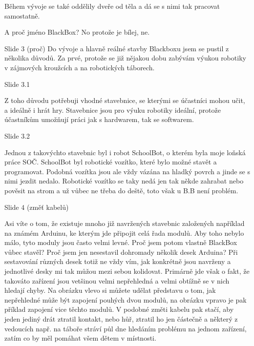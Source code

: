 Během vývoje se také oddělily dveře od těla a dá se s nimi tak pracovat samostatně.

A proč jméno BlackBox? No protože je bílej, ne. %


Slide 3 (proč)
Do vývoje a hlavně reálné stavby Blackboxu jsem se pustil z několika důvodů. 
Za prvé, protože se již nějakou dobu zabývám 
výukou robotiky v zájmových kroužcích a na robotických táborech. 

    Slide 3.1

    Z toho důvodu potřebuji 
    vhodné stavebnice, se kterými se účastníci mohou učit, a ideálně i hrát hry.
    Stavebnice jsou pro výuku robotiky ideální, protože účastníkům umožňují práci jak 
    s hardwarem, tak se softwarem. 

    Slide 3.2

    Jednou z takovýchto stavebnic byl i robot SchoolBot, o kterém byla moje loňská práce SOČ.
    SchoolBot byl robotické vozítko, které bylo možné stavět a programovat.  
    Podobná vozítka jsou ale vždy vázána na hladký povrch a jinde se s nimi jezdit nedalo.
    Robotické vozítko se taky nedá jen tak někde zahrabat nebo pověsit na strom a už vůbec ne třeba do deště,
    toto však u B.B není problém.


Slide 4 (změť kabelů)

Asi víte o tom, že existuje mnoho již navržených stavebnic založených například na známém Arduinu, 
ke kterým jde připojit celá řada modulů. Aby toho nebylo málo, tyto moduly jsou často velmi levné. 
Proč jsem potom vlastně BlackBox vůbec stavěl? Proč jsem jen nesestavil dohromady několik desek Arduina? 
Při sestavování různých desek
totiž ne vždy vím, jak konkrétně jsou navrženy a jednotlivé desky mi tak můžou mezi sebou kolidovat.
Primárně jde však o fakt, že takováto zařízení jsou vetšinou velmi nepřehledná a velmi obtížně se v nich 
hledají chyby. Na obrázku vlevo si můžete udělat představu o tom, jak nepřehledné může být zapojení 
pouhých dvou modulů, na obrázku vpravo je pak příklad zapojení vice těchto modulů. 
V podobné změti kabelu pak stačí, aby jeden jediný drát 
ztratil kontakt, nebo hůř, ztratil ho jen částečně a některý z vedoucích 
např. na táboře stráví půl dne hledáním problému 
na jednom zařízení, zatím co by měl pomáhat všem dětem v místnosti.

